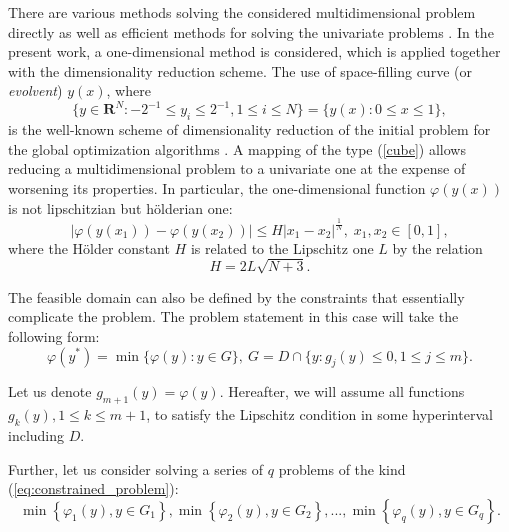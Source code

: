 \documentclass[runningheads]{llncs}
\begin{document}
There are various methods solving the considered multidimensional problem directly
\cite{SergeyevKvasov2017, Jones2009} as well as efficient methods for solving the univariate problems \cite{Norkin1992, Strongin2000}.
In the present work, a one-dimensional method is considered, which is applied together with the
dimensionality reduction scheme.
The use of space-filling curve (or \textit{evolvent}) $y(x)$, where
\begin{equation}
\label{cube}
\lbrace y\in \mathbf{R}^N:-2^{-1}\leqslant y_i\leqslant 2^{-1},1\leqslant i\leqslant
N\rbrace=\{y(x):0\leqslant x\leqslant 1\},
\end{equation}
 is the well-known scheme of dimensionality reduction
 of the initial problem for the global optimization algorithms
\cite{Sergeyev2013}.
A mapping of the type (\ref{cube}) allows reducing a multidimensional problem to a univariate one at the expense of worsening its properties. In particular, the
one-dimensional function \(\varphi(y(x))\) is not lipschitzian but h\"{o}lderian one:
\begin{displaymath}
\label{holder}
|\varphi(y(x_1))-\varphi(y(x_2))|\leqslant H{|x_1-x_2|}^{\frac{1}{N}}, \; x_1,x_2\in[0,1],
\end{displaymath}
where the H\"{o}lder constant \(H\) is related to the Lipschitz one \(L\) by the relation
\begin{displaymath}
  H=2L\sqrt{N+3}.
\end{displaymath}

The feasible domain can also be defined by the constraints that essentially complicate the problem.
The problem statement in this case will take the following form:
\begin{equation}
  \label{eq:constrained_problem}
  \varphi(y^*)=\min\{\varphi(y):y\in G\},\:G=D \cap \{y: g_j(y)\leqslant 0, 1\leqslant j\leqslant m\}.
\end{equation}

Let us denote \(g_{m+1}(y)=\varphi(y)\). Hereafter, we will assume all functions
\(g_k(y),1\leqslant k \leqslant m+1\),
to satisfy the Lipschitz condition in some hyperinterval including \(D\).

Further, let us consider solving a series of \(q\) problems of the kind
(\ref{eq:constrained_problem}):
\begin{equation}
  \label{eq:many_problems}
  \min\left\{\varphi_1(y), y\in G_1 \right\}, \min\left\{\varphi_2(y), y\in G_2\right\},...,
\min\left\{\varphi_q(y), y\in G_q\right\}.
\end{equation}
\end{document}
